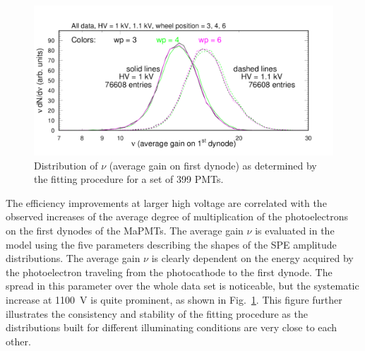 \begin{figure}[h!]
	\centering
	\includegraphics[width=0.98\linewidth, trim=0 12 50 35,clip]{figures/pglobal_nu.pdf}
	\caption{Distribution of $\nu$ (average gain on first dynode) as determined by the fitting procedure for a set of 399 PMTs.}
	\label{fig:pglobal_nu}
\end{figure}
The efficiency improvements at larger high voltage are correlated with the observed increases of the average degree of multiplication of the photoelectrons on the first dynodes of the MaPMTs. The average gain $\nu$ is evaluated in the model using the five parameters describing the shapes of the SPE amplitude distributions. The average gain $\nu$ is clearly dependent on the energy acquired by the photoelectron traveling from the photocathode to the first dynode. The spread in this parameter over the whole data set is noticeable, but the systematic increase at 1100~V is quite prominent, as shown in Fig.~\ref{fig:pglobal_nu}. This figure further illustrates the consistency and stability of the fitting procedure as the distributions built for different illuminating conditions are very close to each other.

